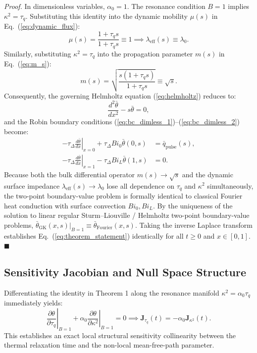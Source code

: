 \documentclass[review,12pt]{article}
\begin{document}
\textit{Proof.} In dimensionless variables, $\alpha_0 = 1$. The resonance condition $B = 1$ implies $\kappa^2 = \tau_q$. Substituting this identity into the dynamic mobility $\mu(s)$ in Eq.~(\ref{eq:dynamic_flux}):
\begin{equation}
\mu(s) = \frac{1 + \tau_q s}{1 + \tau_q s} \equiv 1 \implies \lambda_{\mathrm{eff}}(s) \equiv \lambda_0.
\end{equation}
Similarly, substituting $\kappa^2 = \tau_q$ into the propagation parameter $m(s)$ in Eq.~(\ref{eq:m_s}):
\begin{equation}
m(s) = \sqrt{\frac{s(1 + \tau_q s)}{1 + \tau_q s}} \equiv \sqrt{s}.
\end{equation}
Consequently, the governing Helmholtz equation (\ref{eq:helmholtz}) reduces to:
\begin{equation}
\frac{d^2\bar{\theta}}{dx^2} - s \bar{\theta} = 0,
\end{equation}
and the Robin boundary conditions (\ref{eq:bc_dimless_1})--(\ref{eq:bc_dimless_2}) become:
\begin{align}
-\tau_\Delta \left.\frac{d\bar{\theta}}{dx}\right|_{x=0} + \tau_\Delta Bi_0 \bar{\theta}(0, s) &= \bar{q}_{\mathrm{pulse}}(s), \\
-\tau_\Delta \left.\frac{d\bar{\theta}}{dx}\right|_{x=1} - \tau_\Delta Bi_L \bar{\theta}(1, s) &= 0.
\end{align}
Because both the bulk differential operator $m(s) \to \sqrt{s}$ and the dynamic surface impedance $\lambda_{\mathrm{eff}}(s) \to \lambda_0$ lose all dependence on $\tau_q$ and $\kappa^2$ simultaneously, the two-point boundary-value problem is formally identical to classical Fourier heat conduction with surface convection $Bi_0, Bi_L$. By the uniqueness of the solution to linear regular Sturm--Liouville / Helmholtz two-point boundary-value problems, $\bar{\theta}_{\mathrm{GK}}(x, s)|_{B=1} \equiv \bar{\theta}_{\mathrm{Fourier}}(x, s)$. Taking the inverse Laplace transform establishes Eq.~(\ref{eq:theorem_statement}) identically for all $t \ge 0$ and $x \in [0, 1]$. $\blacksquare$

\subsection{Sensitivity Jacobian and Null Space Structure}

Differentiating the identity in Theorem 1 along the resonance manifold $\kappa^2 = \alpha_0 \tau_q$ immediately yields:
\begin{equation}
\left.\frac{\partial \theta}{\partial \tau_q}\right|_{B=1} + \alpha_0 \left.\frac{\partial \theta}{\partial \kappa^2}\right|_{B=1} = 0 \implies \bm{J}_{\tau_q}(t) = -\alpha_0 \bm{J}_{\kappa^2}(t).
\label{eq:collinearity_result}
\end{equation}
This establishes an exact local structural sensitivity collinearity between the thermal relaxation time and the non-local mean-free-path parameter. 
\end{document}
